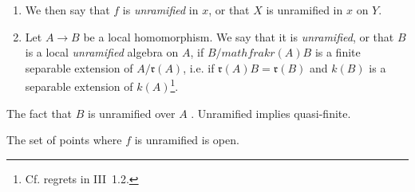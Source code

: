 \begin{defn}
    \begin{enumerate}[\normalfont(a)]
        \item We then say that $f$ is \emph{unramified} in $x$, or that $X$ is unramified in $x$ on $Y$.
        \item Let $A\to B$ be a local homomorphism.
            We say that it is \emph{unramified}, or that $B$ is a local \emph{unramified} algebra on $A$, if $B/mathfrak{r}(A)B$ is a finite separable extension of $A/\mathfrak{r}(A)$, i.e. if $\mathfrak{r}(A)B=\mathfrak{r}(B)$ and $k(B)$ is a separable extension of $k(A)$\footnote{Cf. regrets in III~1.2.}.
    \end{enumerate}
\end{defn}

\begin{rem}
    The fact that $B$ is unramified over $A$ \completelyunsure.
    Unramified implies quasi-finite.
\end{rem}

\begin{cor}
    The set of points where $f$ is unramified is open.
\end{cor}

